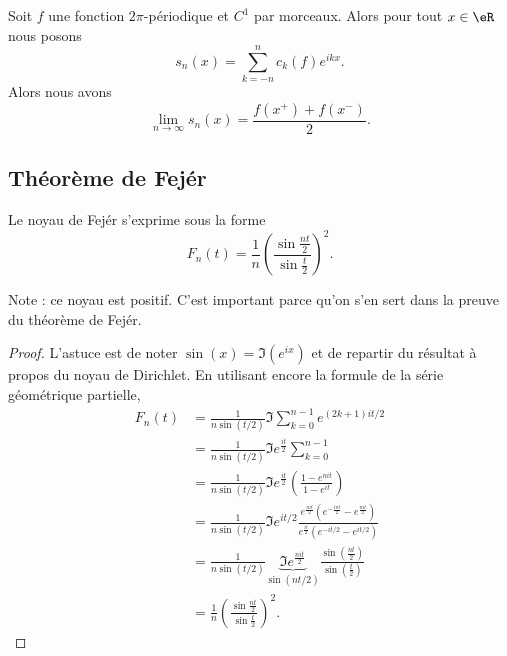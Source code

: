 \begin{theorem}
    Soit \( f\) une fonction \( 2\pi\)-périodique et \( C^1\) par morceaux. Alors pour tout \( x\in \eR\) nous posons
    \begin{equation}
        s_n(x)=\sum_{k=-n}^nc_k(f) e^{ikx}.
    \end{equation}
    Alors nous avons
    \begin{equation}
        \lim_{n\to \infty} s_n(x)=\frac{ f(x^+)+f(x^-) }{ 2 }.
    \end{equation}
\end{theorem}

\subsection{Théorème de Fejér}

\begin{lemma}   \label{LemtCAjJz}
    Le noyau de Fejér s'exprime sous la forme
    \begin{equation}    \label{EqLOtzCf}
        F_n(t)=\frac{1}{ n }\left( \frac{ \sin\frac{ nt }{2} }{ \sin\frac{ t }{2} } \right)^2.
    \end{equation}
\end{lemma}
Note : ce noyau est positif. C'est important parce qu'on s'en sert dans la preuve du théorème de Fejér.

\begin{proof}
    L'astuce est de noter \( \sin(x)=\Im( e^{ix})\) et de repartir du résultat à propos du noyau de Dirichlet. En utilisant encore la formule de la série géométrique partielle,
    \begin{subequations}
        \begin{align}
            F_n(t)&=\frac{1}{ n\sin(t/2) }\Im\sum_{k=0}^{n-1} e^{(2k+1)it/2}\\
            &=\frac{1}{ n\sin(t/2) }\Im e^{\frac{ it }{ 2 }}\sum_{k=0}^{n-1}\\
            &=\frac{1}{ n\sin(t/2) }\Im e^{\frac{ it }{ 2 }}\left( \frac{ 1- e^{nit} }{ 1- e^{it} } \right)\\
            &=\frac{1}{ n\sin(t/2) }\Im e^{it/2}\frac{  e^{\frac{ nit }{ 2 }}\left(  e^{-\frac{ int }{2}}- e^{\frac{ nit }{2}} \right) }{  e^{\frac{ it }{2}}\left(  e^{-it/2}- e^{it/2} \right) }\\
            &=\frac{1}{ n\sin(t/2) }\underbrace{\Im e^{\frac{ nit }{2}}}_{\sin(nt/2)}\frac{ \sin\left( \frac{ nt }{ 2 } \right) }{ \sin(\frac{ t }{2}) }\\
            &=\frac{1}{ n }\left( \frac{ \sin\frac{ nt }{2} }{ \sin\frac{ t }{2} } \right)^2.
        \end{align}
    \end{subequations}
\end{proof}


